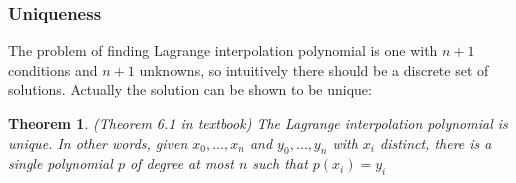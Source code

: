 \documentclass[20pt]{article} %
\theoremstyle{break}
\newtheorem{thm}[definition]{Theorem}
\begin{document}
  \newpage

  \subsubsection{Uniqueness}
  
  The problem of finding Lagrange interpolation polynomial is one with $n+1$ conditions and $n+1$ unknowns, so intuitively there should be a discrete set of solutions. Actually the solution can be shown to be unique:

  \begin{thm}\label{uniq_lag} (Theorem 6.1 in textbook)
  The Lagrange interpolation polynomial is unique. In other words, given $x_0, \dots, x_n$ and $y_0, \dots, y_n$ with $x_i$ distinct, there is a single polynomial $p$ of degree at most $n$ such that $p(x_i)=y_i$
  \end{thm}
\end{document}
